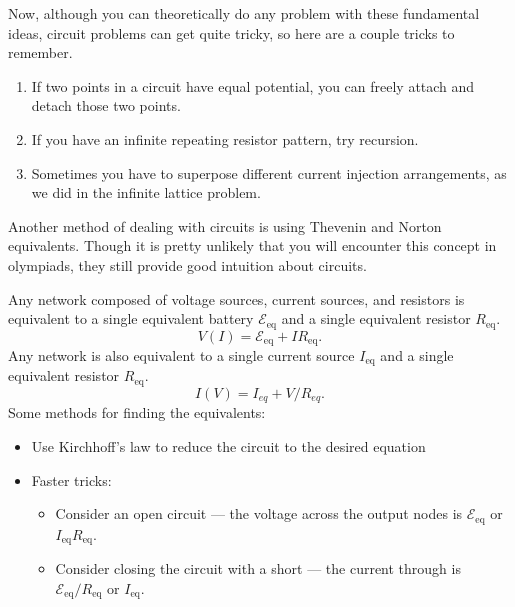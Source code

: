 \documentclass[11pt]{scrartcl}
\begin{document}
\begin{tip}
    Now, although you can theoretically do any problem with these fundamental ideas, circuit problems can get quite tricky, so here are a couple tricks to remember.

    \begin{enumerate}
        \item If two points in a circuit have equal potential, you can freely attach and detach those two points.
        \item If you have an infinite repeating resistor pattern, try recursion.
        \item Sometimes you have to superpose different current injection arrangements, as we did in the infinite lattice problem.
    \end{enumerate}
\end{tip}

Another method of dealing with circuits is using Thevenin and Norton equivalents. Though it is pretty unlikely that you will encounter this concept in olympiads, they still provide good intuition about circuits.

\begin{theorem}
    Any network composed of voltage sources, current sources, and resistors is equivalent to a single equivalent battery $\mathcal E_{\text{eq}}$ and a single equivalent resistor $R_{\text{eq}}$.
    $$V(I) = \mathcal E_{\text{eq}} + IR_{\text{eq}}.$$
    Any network is also equivalent to a single current source $I_{\text{eq}}$ and a single equivalent resistor $R_{\text{eq}}$. 
    $$I(V) = I_{eq} + V/R_{eq}.$$
    Some methods for finding the equivalents:
    \begin{itemize}
        \item Use Kirchhoff's law to reduce the circuit to the desired equation
        \item Faster tricks:
        \begin{itemize}
            \item Consider an open circuit --- the voltage across the output nodes is $\mathcal E_{\text{eq}}$ or $I_{\text{eq}}R_{\text{eq}}$.
            \item Consider closing the circuit with a short --- the current through is $\mathcal E_{\text{eq}}/R_{\text{eq}}$ or $I_{\text{eq}}$.
        \end{itemize}
    \end{itemize}
\end{theorem}
\end{document}
